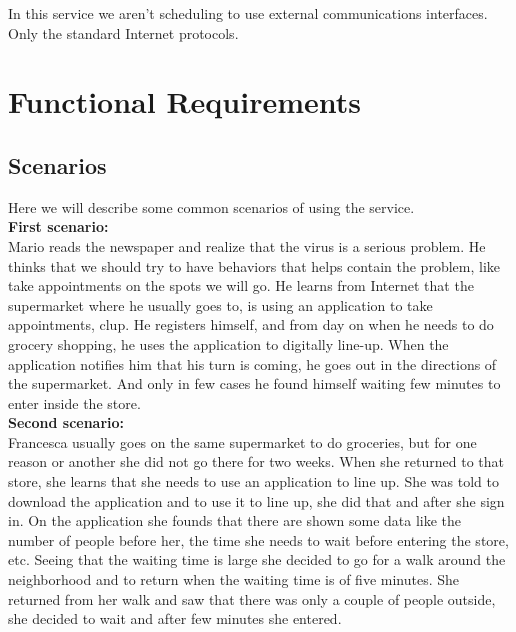 In this service we aren't scheduling to use external communications interfaces.
Only the standard Internet protocols.

\section{Functional Requirements}

\subsection{Scenarios}

Here we will describe some common scenarios of using the service.\\

\textbf{First scenario:}\\
Mario reads the newspaper and realize that the virus is a serious problem. He thinks that we should try to have behaviors that helps contain the problem, like take appointments on the spots we will go. He learns from Internet that the supermarket where he usually goes to, is using an application to take appointments, \gls{clup}. He registers himself, and from day on when he needs to do grocery shopping, he uses the application to digitally line-up. When the application notifies him that his turn is coming, he goes out in the directions of the supermarket. And only in few cases he found himself waiting few minutes to enter inside the store.\\

\textbf{Second scenario:}\\
Francesca usually goes on the same supermarket to do groceries, but for one reason or another she did not go there for two weeks. When she returned to that store, she learns that she needs to use an application to line up. She was told to download the application and to use it to line up, she did that and after she sign in. 
On the application she founds that there are shown some data like  the number of people before her, the time she needs to wait before entering the store, etc. 
Seeing that the waiting time is large she decided to go for a walk around the neighborhood and to return when the waiting time is of five minutes. She returned from her walk and saw that there was only a couple of people outside, she decided to wait and after few minutes she entered.\\

